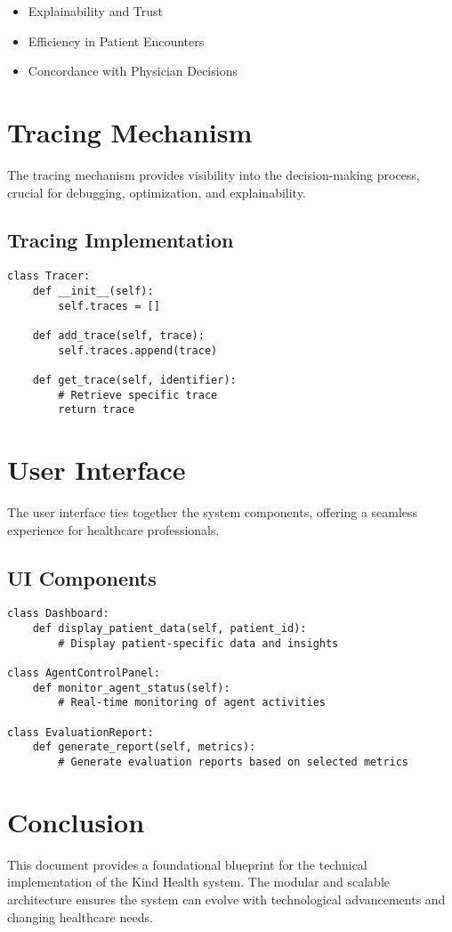\documentclass{article}
\begin{document}
\begin{itemize}
    \item Explainability and Trust
    \item Efficiency in Patient Encounters
    \item Concordance with Physician Decisions
\end{itemize}

\section{Tracing Mechanism}

The tracing mechanism provides visibility into the decision-making process, crucial for debugging, optimization, and explainability.

\subsection{Tracing Implementation}

\begin{verbatim}
class Tracer:
    def __init__(self):
        self.traces = []

    def add_trace(self, trace):
        self.traces.append(trace)

    def get_trace(self, identifier):
        # Retrieve specific trace
        return trace
\end{verbatim}

\section{User Interface}

The user interface ties together the system components, offering a seamless experience for healthcare professionals.

\subsection{UI Components}

\begin{verbatim}
class Dashboard:
    def display_patient_data(self, patient_id):
        # Display patient-specific data and insights

class AgentControlPanel:
    def monitor_agent_status(self):
        # Real-time monitoring of agent activities

class EvaluationReport:
    def generate_report(self, metrics):
        # Generate evaluation reports based on selected metrics
\end{verbatim}

\section{Conclusion}

This document provides a foundational blueprint for the technical implementation of the Kind Health system. The modular and scalable architecture ensures the system can evolve with technological advancements and changing healthcare needs.
\end{document}
